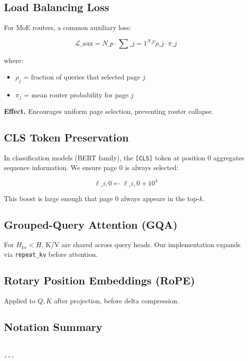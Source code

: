 \subsection{Load Balancing Loss}

For MoE routers, a common auxiliary loss:

\[
\mathcal{L}\_\text{aux} = N\_p \cdot \sum\_{j=1}^{N\_p} \rho\_j \cdot \pi\_j
\tag{3.16}
\]

where:

\begin{itemize}
\item $\rho_j$ = fraction of queries that selected page $j$
\item $\pi_j$ = mean router probability for page $j$

\end{itemize}
\textbf{Effect.} Encourages uniform page selection, preventing router collapse.

\subsection{CLS Token Preservation}

In classification models (BERT family), the \texttt{[CLS]} token at position 0 
aggregates sequence information. We ensure page 0 is always selected:

\[
\ell\_{i, 0} \leftarrow \ell\_{i, 0} + 10^4
\tag{3.17}
\]

This boost is large enough that page 0 always appears in the top-$k$.

\subsection{Grouped-Query Attention (GQA)}

For $H_{kv} < H$, K/V are shared across query heads. Our implementation 
expands via \texttt{repeat\_kv} before attention.

\subsection{Rotary Position Embeddings (RoPE)}

Applied to $Q, K$ after projection, before delta compression.

\subsection{Notation Summary}

\begin{lstlisting}

---
\end{lstlisting}
